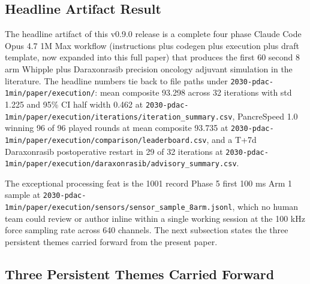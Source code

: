 
\subsection{Headline Artifact Result}
\label{sec:conclusions-headline}

The headline artifact of this v0.9.0 release is a complete four
phase Claude Code Opus 4.7 1M Max workflow (instructions plus
codegen plus execution plus draft template, now expanded into this
full paper) that produces the first 60 second 8 arm Whipple plus
Daraxonrasib precision oncology adjuvant simulation in the
literature. The headline numbers tie back to file paths under
\texttt{2030-pdac-1min/paper/execution/}: mean composite 93.298
across 32 iterations with std 1.225 and 95\% CI half width 0.462
at
\texttt{2030-pdac-1min/paper/execution/iterations/iteration_summary.csv},
PancreSpeed 1.0 winning 96 of 96 played rounds at mean composite
93.735 at
\texttt{2030-pdac-1min/paper/execution/comparison/leaderboard.csv},
and a T+7d Daraxonrasib postoperative restart in 29 of 32
iterations at
\texttt{2030-pdac-1min/paper/execution/daraxonrasib/advisory_summary.csv}.

The exceptional processing feat is the 1001 record Phase 5 first
100 ms Arm 1 sample at
\texttt{2030-pdac-1min/paper/execution/sensors/sensor_sample_8arm.jsonl},
which no human team could review or author inline within a single
working session at the 100 kHz force sampling rate across 640
channels. The next subsection states the three persistent themes
carried forward from the present paper.

\subsection{Three Persistent Themes Carried Forward}
\label{sec:conclusions-themes}


